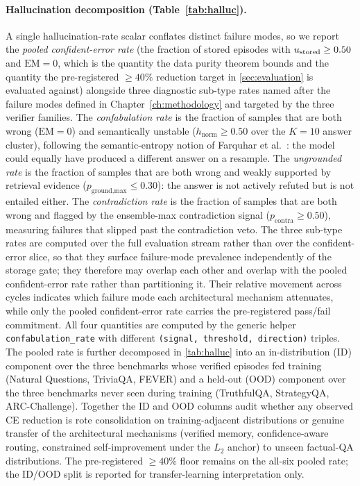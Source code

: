 \paragraph{Hallucination decomposition (Table~\ref{tab:halluc}).}
A single hallucination-rate scalar conflates distinct failure modes,
so we report the \emph{pooled confident-error rate} (the fraction
of stored episodes with $u_{\text{stored}} \geq 0.50$ and $\mathrm{EM}=0$,
which is the quantity the data purity theorem bounds and the quantity
the pre-registered $\geq 40\%$ reduction target in
\cref{sec:evaluation} is evaluated against) alongside three
diagnostic sub-type rates named after the failure modes defined in
Chapter~\ref{ch:methodology} and targeted by the three verifier
families.
The \emph{confabulation rate} is the fraction of samples that are
both wrong ($\mathrm{EM}=0$) and semantically unstable
($h_{\text{norm}} \geq 0.50$ over the $K=10$ answer cluster),
following the semantic-entropy notion of Farquhar et
al.~\cite{farquhar2024semantic}: the model could equally have produced
a different answer on a resample.
The \emph{ungrounded rate} is the fraction of samples that are both
wrong and weakly supported by retrieval evidence
($p_{\text{ground,max}} \leq 0.30$): the answer is not actively
refuted but is not entailed either.
The \emph{contradiction rate} is the fraction of samples that are
both wrong and flagged by the ensemble-max contradiction signal
($p_{\text{contra}} \geq 0.50$), measuring failures that slipped past
the contradiction veto.
The three sub-type rates are computed over the full evaluation
stream rather than over the confident-error slice, so that they
surface failure-mode prevalence independently of the storage gate;
they therefore may overlap each other and overlap with the pooled
confident-error rate rather than partitioning it. Their relative
movement across cycles indicates which failure mode each
architectural mechanism attenuates, while only the pooled
confident-error rate carries the pre-registered pass/fail commitment.
All four quantities are computed by the generic helper
\texttt{confabulation\_rate} with different
\texttt{(signal, threshold, direction)} triples.
The pooled rate is further decomposed in \cref{tab:halluc} into
an in-distribution (ID) component over the three benchmarks whose
verified episodes fed training (Natural Questions, TriviaQA, FEVER)
and a held-out (OOD) component over the three benchmarks never
seen during training (TruthfulQA, StrategyQA, ARC-Challenge).
Together the ID and OOD columns audit whether any observed
CE reduction is rote consolidation on training-adjacent
distributions or genuine transfer of the architectural mechanisms
(verified memory, confidence-aware routing, constrained
self-improvement under the $L_2$ anchor) to unseen factual-QA
distributions. The pre-registered $\geq 40\%$ floor remains on the
all-six pooled rate; the ID/OOD split is reported for
transfer-learning interpretation only.

